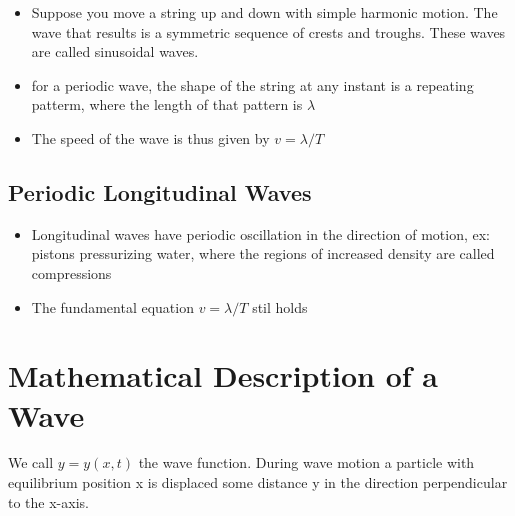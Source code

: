 \documentclass[11pt, a4paper]{article}
\begin{document}
\begin{itemize}
    \item Suppose you move a string up and down with simple harmonic motion. The wave
        that results is a symmetric sequence of crests and troughs. These waves are
        called sinusoidal waves.
    \item for a periodic wave, the shape of the string at any instant is a repeating patterm,
        where the length of that pattern is $\lambda$
    \item The speed of the wave is thus given by $v = \lambda/T$
\end{itemize}

\subsection{Periodic Longitudinal Waves}
\begin{itemize}
    \item Longitudinal waves have periodic oscillation in the direction of motion, ex: pistons
        pressurizing water, where the regions of increased density are called compressions
    \item The fundamental equation $v = \lambda/T$ stil holds
\end{itemize}

\section{Mathematical Description of a Wave}
We call $y = y(x,t)$ the wave function. During wave motion a particle with equilibrium position
x is displaced some distance y in the direction perpendicular to the x-axis.
\end{document}

